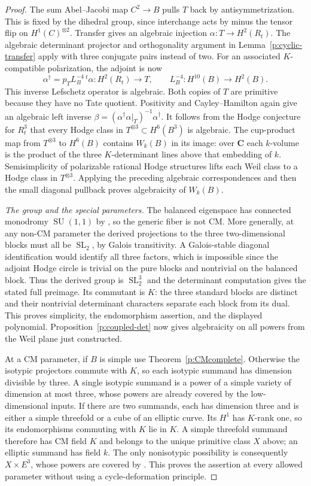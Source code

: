 \documentclass[11pt,reqno]{article}
\theoremstyle{emphasizedplain}
\theoremstyle{emphasizeddefinition}
\theoremstyle{emphasizeddefinition}
\DeclareMathOperator{\SL}{SL}
\DeclareMathOperator{\SU}{SU}
\newcommand{\C}{\mathbf C}
\begin{document}
\begin{proof}
The sum Abel--Jacobi map $C^2\to B$ pulls $T$ back by
antisymmetrization. This is fixed by the dihedral group, since
interchange acts by minus the tensor flip on $H^1(C)^{\otimes2}$.
Transfer gives an algebraic injection $\alpha:T\to H^2(R_t)$.
The algebraic determinant projector and orthogonality argument
in Lemma~\ref{p:cyclic-transfer} apply with three conjugate pairs
instead of two. For an associated $K$-compatible polarization,
the adjoint is now
\[
 \alpha^\dagger=p_T L_B^{-4}\,{}^t\!\alpha:
 H^2(R_t)\longrightarrow T,
 \qquad L_B^{-4}:H^{10}(B)\longrightarrow H^2(B).
\]
This inverse Lefschetz operator is algebraic. Both copies of $T$
are primitive because they have no Tate quotient. Positivity
and Cayley--Hamilton again give an algebraic left inverse
$\beta=(\alpha^\dagger\alpha|_T)^{-1}\alpha^\dagger$.
It follows from the Hodge conjecture for $R_t^3$ that every Hodge
class in $T^{\otimes3}\subset H^6(B^3)$ is algebraic.
The cup-product map from $T^{\otimes3}$ to $H^6(B)$ contains
$W_k(B)$ in its image: over $\C$ each $k$-volume is the product
of the three $K$-determinant lines above that embedding of $k$.
Semisimplicity of polarizable rational Hodge structures lifts
each Weil class to a Hodge class in $T^{\otimes3}$. Applying
the preceding algebraic correspondences and then the small
diagonal pullback proves algebraicity of $W_k(B)$.

\emph{The group and the special parameters.}
The balanced eigenspace has connected monodromy $\SU(1,1)$ by
\cite[Proposition 4.7(i)]{MoonenCyclic}, so the generic fiber is
not CM. More generally, at any non-CM parameter the derived
projections to the three two-dimensional blocks must all be
$\SL_2$, by Galois transitivity. A Galois-stable diagonal
identification would identify all three factors, which is
impossible since the adjoint Hodge circle is trivial on the pure
blocks and nontrivial on the balanced block. Thus the derived
group is $\SL_2^3$ and the determinant computation gives the
stated full preimage. Its commutant is $K$: the three standard
blocks are distinct and their nontrivial determinant characters
separate each block from its dual. This proves simplicity,
the endomorphism assertion, and the displayed polynomial.
Proposition~\ref{p:coupled-det} now gives algebraicity on all
powers from the Weil plane just constructed.

At a CM parameter, if $B$ is simple use Theorem~\ref{p:CMcomplete}.
Otherwise the isotypic projectors commute with $K$, so each
isotypic summand has dimension divisible by three. A single
isotypic summand is a power of a simple variety of dimension at
most three, whose powers are already covered by the low-dimensional
inputs. If there are two summands, each has dimension three and
is either a simple threefold or a cube of an elliptic curve.
Its $H^1$ has $K$-rank one, so its endomorphisms commuting with
$K$ lie in $K$. A simple threefold summand therefore has CM
field $K$ and belongs to the unique primitive class $X$ above;
an elliptic summand has field $k$. The only nonisotypic possibility
is consequently $X\times E^3$, whose powers are covered by
\cite[Corollary 1.11]{MilneTateStandard}. This proves the assertion
at every allowed parameter without using a cycle-deformation principle.


\end{proof}
\end{document}
